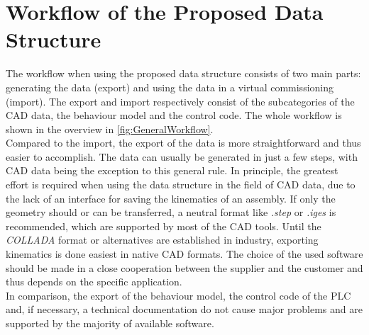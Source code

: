 \section{Workflow of the Proposed Data Structure} 
    The workflow when using the proposed data structure consists of two main parts: generating the data (export) and using the data in a virtual commissioning (import). The export and import respectively consist of the subcategories of the CAD data, the behaviour model and the control code. The whole workflow is shown in the overview in \autoref{fig:GeneralWorkflow}.\\

    Compared to the import, the export of the data is more straightforward and thus easier to accomplish. The data can usually be generated in just a few steps, with CAD data being the exception to this general rule. In principle, the greatest effort is required when using the data structure in the field of CAD data, due to the lack of an interface for saving the kinematics of an assembly. If only the geometry should or can be transferred, a neutral format like \textit{.step} or \textit{.iges} is recommended, which are supported by most of the CAD tools. Until the \textit{COLLADA} format or alternatives are established in industry, exporting kinematics is done easiest in native CAD formats. The choice of the used software should be made in a close cooperation between the supplier and the customer and thus depends on the specific application. \\
    In comparison, the export of the behaviour model, the control code of the PLC and, if necessary, a technical documentation do not cause major problems and are supported by the majority of available software.\\
    
